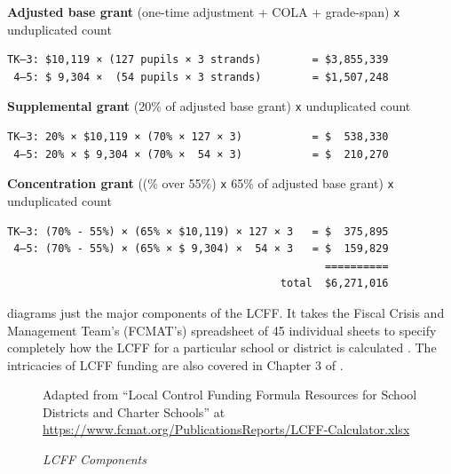 \noindent\textbf{Adjusted base grant} \hfill{}(one-time adjustment + COLA + grade-span) \texttt{x} unduplicated count
\OnehalfSpacing%
\begin{verbatim}
TK–3: $10,119 × (127 pupils × 3 strands)        = $3,855,339
 4–5: $ 9,304 ×  (54 pupils × 3 strands)        = $1,507,248
\end{verbatim}
\noindent\textbf{Supplemental grant} \hfill(20\% of adjusted base grant) \texttt{x} unduplicated count
\OnehalfSpacing%
\begin{verbatim}
TK–3: 20% × $10,119 × (70% × 127 × 3)           = $  538,330
 4–5: 20% × $ 9,304 × (70% ×  54 × 3)           = $  210,270
\end{verbatim}
\noindent\textbf{Concentration grant} \hfill{}((\% over 55\%) \texttt{x} 65\% of adjusted base grant) \texttt{x} unduplicated count
\OnehalfSpacing%
\begin{verbatim}
TK–3: (70% - 55%) × (65% × $10,119) × 127 × 3   = $  375,895
 4–5: (70% - 55%) × (65% × $ 9,304) ×  54 × 3   = $  159,829
                                                  ==========
                                           total  $6,271,016
\end{verbatim}
\DoubleSpacing

 diagrams just the major components of the LCFF. It takes the Fiscal Crisis and Management Team's (FCMAT's) spreadsheet of 45 individual sheets to specify completely how the LCFF for a particular school or district is calculated \parencite{FCMAT2024}. The intricacies of LCFF funding are also covered in Chapter 3 of \textcite[35–58]{Aguinaldo.etal2022}.

\begin{figure}[htb]
  \caption[LCFF Components]{\textit{LCFF Components}}\label{fig:lcff_components}%
  {Adapted from ``Local Control Funding Formula Resources for School Districts and Charter Schools'' at \url{https://www.fcmat.org/PublicationsReports/LCFF-Calculator.xlsx}}
\end{figure}

